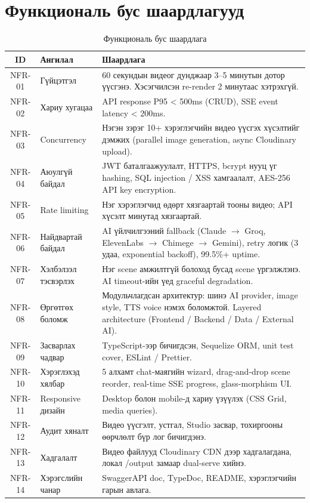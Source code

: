 \section{Функциональ бус шаардлагууд}

\begin{table}[H]
\centering
\label{tab:nfr}
\begin{tabular}{|c|p{3.2cm}|p{7.5cm}|}
\hline
\textbf{ID} & \textbf{Ангилал} & \textbf{Шаардлага} \\
\hline
NFR-01 & Гүйцэтгэл & 60 секундын видеог дунджаар 3–5 минутын дотор үүсгэнэ. Хэсэгчилсэн re-render 2 минутаас хэтрэхгүй. \\
\hline
NFR-02 & Хариу хугацаа & API response P95 < 500ms (CRUD), SSE event latency < 200ms. \\
\hline
NFR-03 & Concurrency & Нэгэн зэрэг 10+ хэрэглэгчийн видео үүсгэх хүсэлтийг дэмжих (parallel image generation, async Cloudinary upload). \\
\hline
NFR-04 & Аюулгүй байдал & JWT баталгаажуулалт, HTTPS, bcrypt нууц үг hashing, SQL injection / XSS хамгаалалт, AES-256 API key encryption. \\
\hline
NFR-05 & Rate limiting & Нэг хэрэглэгчид өдөрт хязгаартай тооны видео; API хүсэлт минутад хязгаартай. \\
\hline
NFR-06 & Найдвартай байдал & AI үйлчилгээний fallback (Claude $\rightarrow$ Groq, ElevenLabs $\rightarrow$ Chimege $\rightarrow$ Gemini), retry логик (3 удаа, exponential backoff), 99.5\%+ uptime. \\
\hline
NFR-07 & Хэлбэлзэл тэсвэрлэх & Нэг scene амжилтгүй болоход бусад scene үргэлжлэнэ. AI timeout-ийн үед graceful degradation. \\
\hline
NFR-08 & Өргөтгөх боломж & Модульчлагдсан архитектур: шинэ AI provider, image style, TTS voice нэмэх боломжтой. Layered architecture (Frontend / Backend / Data / External AI). \\
\hline
NFR-09 & Засварлах чадвар & TypeScript-ээр бичигдсэн, Sequelize ORM, unit test cover, ESLint / Prettier. \\
\hline
NFR-10 & Хэрэглэхэд хялбар & 5 алхамт chat-маягийн wizard, drag-and-drop scene reorder, real-time SSE progress, glass-morphism UI. \\
\hline
NFR-11 & Responsive дизайн & Desktop болон mobile-д хариу үзүүлэх (CSS Grid, media queries). \\
\hline
NFR-12 & Аудит хяналт & Видео үүсгэлт, устгал, Studio засвар, тохиргооны өөрчлөлт бүр лог бичигдэнэ. \\
\hline
NFR-13 & Хадгалалт & Видео файлууд Cloudinary CDN дээр хадгалагдана, локал /output замаар dual-serve хийнэ. \\
\hline
NFR-14 & Хэрэгслийн чанар & SwaggerAPI doc, TypeDoc, README, хэрэглэгчийн гарын авлага. \\
\hline
\end{tabular}
\caption{Функциональ бус шаардлага}
\end{table}

